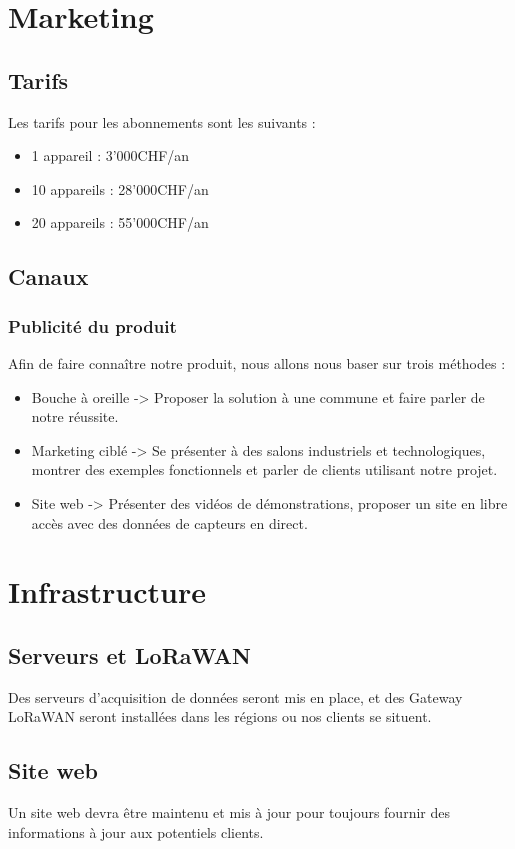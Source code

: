 \section{Marketing}
\subsection{Tarifs}
Les tarifs pour les abonnements sont les suivants :
\begin{itemize}
    \item 1 appareil : 3'000CHF/an
    \item 10 appareils : 28'000CHF/an
    \item 20 appareils : 55'000CHF/an
\end{itemize}

\subsection{Canaux}
\subsubsection{Publicité du produit}
Afin de faire connaître notre produit, nous allons nous baser sur trois
méthodes :
\begin{itemize}
    \item Bouche à oreille -> Proposer la solution à une commune
    et faire parler de notre réussite.
    \item Marketing ciblé -> Se présenter à des salons industriels
    et technologiques, montrer des exemples fonctionnels et parler de
    clients utilisant notre projet.
    \item Site web -> Présenter des vidéos de démonstrations,
    proposer un site en libre accès avec des données de capteurs en direct.
\end{itemize}

\section{Infrastructure}
\subsection{Serveurs et LoRaWAN}
Des serveurs d'acquisition de données seront mis en place,
et des Gateway LoRaWAN seront installées dans les régions ou nos
clients se situent.

\subsection{Site web}
Un site web devra être maintenu et mis à jour pour toujours fournir
des informations à jour aux potentiels clients.

